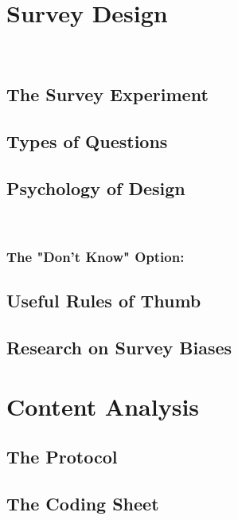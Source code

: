 \documentclass[12pt]{article}\usepackage[]{graphicx}\usepackage[]{color}
\begin{document}
\begin{flushleft}
\section{Survey Design}
\hfill \\

\subsection{The Survey Experiment}

\subsection{Types of Questions}

\subsection{Psychology of Design}



\hfill \\
\subsubsection{The "Don't Know" Option:}



\subsection{Useful Rules of Thumb}

\subsection{Research on Survey Biases}


\clearpage





\clearpage
\section{Content Analysis}

\subsection{The Protocol}

\subsection{The Coding Sheet}


\end{flushleft}
\end{document}
